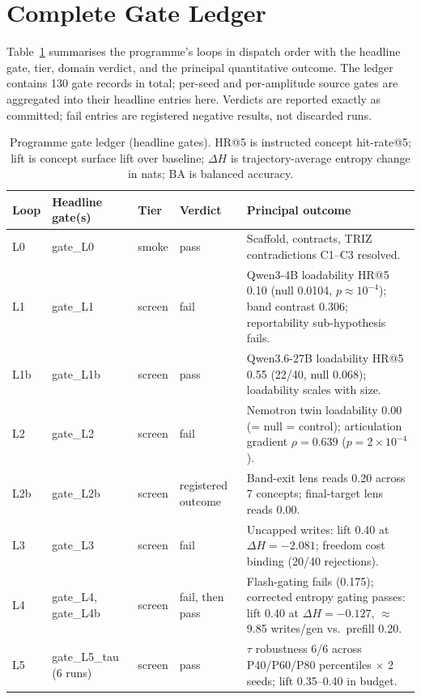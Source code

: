 \section{Complete Gate Ledger}
\label{app:ledger}

Table~\ref{tab:ledger} summarises the programme's loops in dispatch order with the headline gate, tier, domain verdict, and the principal quantitative outcome. The ledger contains 130 gate records in total; per-seed and per-amplitude source gates are aggregated into their headline entries here. Verdicts are reported exactly as committed; fail entries are registered negative results, not discarded runs.

\begin{table}[t]
\caption{Programme gate ledger (headline gates). HR@5 is instructed concept hit-rate@5; lift is concept surface lift over baseline; $\Delta H$ is trajectory-average entropy change in nats; BA is balanced accuracy.}
\label{tab:ledger}
\vskip 0.1in
\centering
{\footnotesize
\begin{tabular}{lp{3.5cm}p{1.9cm}p{2.6cm}p{6.6cm}}
\toprule
\textbf{Loop} & \textbf{Headline gate(s)} & \textbf{Tier} & \textbf{Verdict} & \textbf{Principal outcome} \\
\midrule
L0  & gate\_L0 & smoke & pass & Scaffold, contracts, TRIZ contradictions C1--C3 resolved. \\
L1  & gate\_L1 & screen & fail & Qwen3-4B loadability HR@5 0.10 (null 0.0104, $p\!\approx\!10^{-4}$); band contrast 0.306; reportability sub-hypothesis fails. \\
L1b & gate\_L1b & screen & pass & Qwen3.6-27B loadability HR@5 0.55 (22/40, null 0.068); loadability scales with size. \\
L2  & gate\_L2 & screen & fail & Nemotron twin loadability 0.00 (= null = control); articulation gradient $\rho=0.639$ ($p=2\times10^{-4}$). \\
L2b & gate\_L2b & screen & registered outcome & Band-exit lens reads 0.20 across 7 concepts; final-target lens reads 0.00. \\
L3  & gate\_L3 & screen & fail & Uncapped writes: lift 0.40 at $\Delta H=-2.081$; freedom cost binding (20/40 rejections). \\
L4  & gate\_L4, gate\_L4b & screen & fail, then pass & Flash-gating fails (0.175); corrected entropy gating passes: lift 0.40 at $\Delta H=-0.127$, $\approx$9.85 writes/gen vs.\ prefill 0.20. \\
L5  & gate\_L5\_tau (6 runs) & screen & pass & $\tau$ robustness 6/6 across P40/P60/P80 percentiles $\times$ 2 seeds; lift 0.35--0.40 in budget. \\

\end{tabular}}
\end{table}
